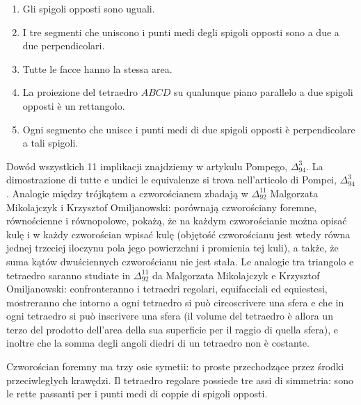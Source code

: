\begin{proposition}
\begin{enumerate}
        \item Gli spigoli opposti sono uguali. %
        \item I tre segmenti che uniscono i punti medi degli spigoli opposti sono a due a due perpendicolari. %
        \item Tutte le facce hanno la stessa area. %
        \item La proiezione del tetraedro $ABCD$ su qualunque piano parallelo a due spigoli opposti è un rettangolo. %
        \item Ogni segmento che unisce i punti medi di due spigoli opposti è perpendicolare a tali spigoli. %
    \end{enumerate}
\end{proposition}

Dowód wszystkich 11 implikacji znajdziemy w artykulu Pompego, $\Delta_{94}^3$. %
La dimostrazione di tutte e undici le equivalenze si trova nell'articolo di Pompei, $\Delta_{94}^3$. %
Analogie między trójkątem a czworościanem zbadają w $\Delta_{92}^{11}$ Malgorzata Mikolajczyk i Krzysztof Omiljanowski: porównają czworościany foremne, równościenne i równopolowe, pokażą, że na każdym czworościanie można opisać kulę i w każdy czworościan wpisać kulę (objętość czworościanu jest wtedy równa jednej trzeciej iloczynu pola jego powierzchni i promienia tej kuli), a także, że suma kątów dwuściennych czworościanu nie jest stała. %
Le analogie tra triangolo e tetraedro saranno studiate in $\Delta_{92}^{11}$ da Malgorzata Mikolajczyk e Krzysztof Omiljanowski: confronteranno i tetraedri regolari, equifacciali ed equiestesi, mostreranno che intorno a ogni tetraedro si può circoscrivere una sfera e che in ogni tetraedro si può inscrivere una sfera (il volume del tetraedro è allora un terzo del prodotto dell'area della sua superficie per il raggio di quella sfera), e inoltre che la somma degli angoli diedri di un tetraedro non è costante. %

Czworościan foremny ma trzy osie symetii: to proste przechodzące przez środki przeciwległych krawędzi. %
Il tetraedro regolare possiede tre assi di simmetria: sono le rette passanti per i punti medi di coppie di spigoli opposti. %

%